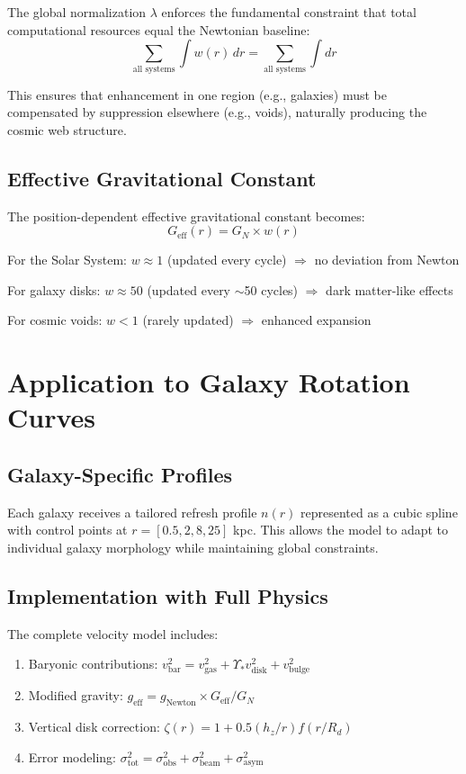 \documentclass[12pt]{article}
\begin{document}
The global normalization $\lambda$ enforces the fundamental constraint that total computational resources equal the Newtonian baseline:
\begin{equation}
\sum_{\text{all systems}} \int w(r) \, dr = \sum_{\text{all systems}} \int dr
\end{equation}

This ensures that enhancement in one region (e.g., galaxies) must be compensated by suppression elsewhere (e.g., voids), naturally producing the cosmic web structure.

\subsection{Effective Gravitational Constant}

The position-dependent effective gravitational constant becomes:
\begin{equation}
G_{\text{eff}}(r) = G_N \times w(r)
\end{equation}

For the Solar System: $w \approx 1$ (updated every cycle) $\Rightarrow$ no deviation from Newton

For galaxy disks: $w \approx 50$ (updated every $\sim$50 cycles) $\Rightarrow$ dark matter-like effects

For cosmic voids: $w < 1$ (rarely updated) $\Rightarrow$ enhanced expansion

\section{Application to Galaxy Rotation Curves}

\subsection{Galaxy-Specific Profiles}

Each galaxy receives a tailored refresh profile $n(r)$ represented as a cubic spline with control points at $r = [0.5, 2, 8, 25]$ kpc. This allows the model to adapt to individual galaxy morphology while maintaining global constraints.

\subsection{Implementation with Full Physics}

The complete velocity model includes:
\begin{enumerate}
\item Baryonic contributions: $v_{\text{bar}}^2 = v_{\text{gas}}^2 + \Upsilon_* v_{\text{disk}}^2 + v_{\text{bulge}}^2$
\item Modified gravity: $g_{\text{eff}} = g_{\text{Newton}} \times G_{\text{eff}}/G_N$
\item Vertical disk correction: $\zeta(r) = 1 + 0.5(h_z/r)f(r/R_d)$
\item Error modeling: $\sigma^2_{\text{tot}} = \sigma^2_{\text{obs}} + \sigma^2_{\text{beam}} + \sigma^2_{\text{asym}}$
\end{enumerate}
\end{document}
